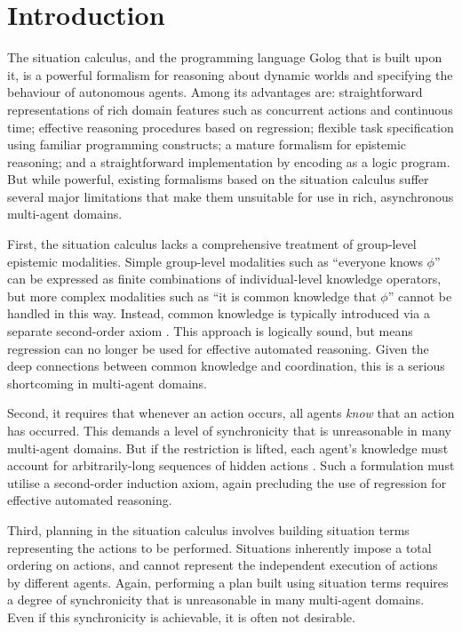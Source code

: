 


\chapter{Introduction}

The situation calculus, and the programming language Golog that is
built upon it, is a powerful formalism for reasoning about dynamic
worlds and specifying the behaviour of autonomous agents. Among its
advantages are: straightforward representations of rich domain features
such as concurrent actions and continuous time; effective reasoning
procedures based on regression; flexible task specification using
familiar programming constructs; a mature formalism for epistemic
reasoning; and a straightforward implementation by encoding as a logic
program. But while powerful, existing formalisms based on the situation
calculus suffer several major limitations that make them unsuitable
for use in rich, asynchronous multi-agent domains.

First, the situation calculus lacks a comprehensive treatment of group-level
epistemic modalities. Simple group-level modalities such as {}``everyone
knows $\phi$'' can be expressed as finite combinations of individual-level
knowledge operators, but more complex modalities such as {}``it is
common knowledge that $\phi$'' cannot be handled in this way. Instead,
common knowledge is typically introduced via a separate second-order
axiom \citep{davis05fo_ma_theory,ghaderi07sc_joint_ability}. This
approach is logically sound, but means regression can no longer be
used for effective automated reasoning. Given the deep connections
between common knowledge and coordination, this is a serious shortcoming
in multi-agent domains.

Second, it requires that whenever an action occurs, all agents \emph{know}
that an action has occurred. This demands a level of synchronicity
that is unreasonable in many multi-agent domains. But if the restriction
is lifted, each agent's knowledge must account for arbitrarily-long
sequences of hidden actions \citep{Lesperance99sitcalc_approach}.
Such a formulation must utilise a second-order induction axiom, again
precluding the use of regression for effective automated reasoning.

Third, planning in the situation calculus involves building situation
terms representing the actions to be performed. Situations inherently
impose a total ordering on actions, and cannot represent the independent
execution of actions by different agents. Again, performing a plan
built using situation terms requires a degree of synchronicity that
is unreasonable in many multi-agent domains. Even if this synchronicity
is achievable, it is often not desirable.\\


